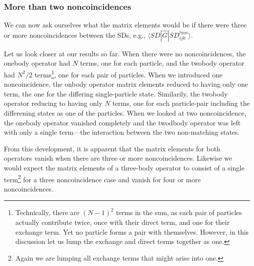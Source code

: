 \documentclass[a4paper, 11pt, notitlepage, english]{article}
\newcommand{\op}[1]{\hat{#1}}
\newcommand{\braopket}[3]{\langle #1 | {#2} | #3 \rangle}
\begin{document}
\subsubsection*{More than two noncoincidences}
We can now ask ourselves what the matrix elements would be if there were three or more noncoincidences between the SDs, e.g., $\braopket{SD}{\op{G}}{SD_{ijk}^{lmn}}$.

Let us look closer at our results so far. When there were no noncoincidences, the onebody operator had $N$ terms, one for each particle, and the twobody operator had $N^2/2$ terms\footnote{Technically, there are $(N-1)^2$ terms in the sum, as each pair of particles actually contribute twice, once with their direct term, and one for their exchange term. Yet no particle forms a pair with themselves. However, in this discussion let us lump the exchange and direct terms together as one.}, one for each pair of particles. When we introduced one noncoincidence, the onbody operator matrix elements reduced to having only one term, the one for the differing single-particle state. Similarily, the twobody operator reducing to having only $N$ terms, one for each particle-pair including the differening states as one of the particles. When we looked at two noncoincidence, the onebody operator vanished completely and the twodbody operator was left with only a single term---the interaction between the two non-matching states. 

From this development, it is apparent that the matrix elements for both operators vanish when there are three or more noncoincidences. Likewise we would expect the matrix elements of a three-body operator to consist of a single term\footnote{Again we are lumping all exchange terms that might arise into one.} for a three noncoincidence case and vanish for four or more noncoincidences.
\end{document}
